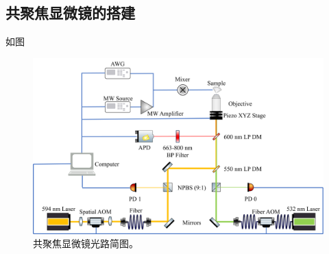 \documentclass[type = bachelor]{whu-thesis}
\begin{document}
\subsection{共聚焦显微镜的搭建}
如图\
\begin{figure}
  \centering
  \includegraphics[width=1.0\textwidth]{figures/Chapter 1/Light Path.png}
  \caption[共聚焦显微镜光路简图]{共聚焦显微镜光路简图。}
  \label{fig: Confocal Optimizer}
\end{figure}
\end{document}
